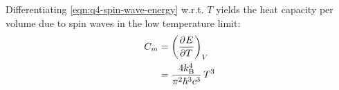 \begin{parts}
	Differentiating \eqref{eqn:q4-spin-wave-energy} w.r.t. $T$ yields the heat capacity per volume due to spin waves in the low temperature limit:
	\begin{align*}
		C_m &= \left(\frac{\partial^{}{E}}{\partial{}{T}^{}}\right)_{V} \\
		&= \frac{4k_\textnormal{B}^4}{\pi^2 \hbar^3 c^3}\, T^3
	\end{align*}
\end{parts}
